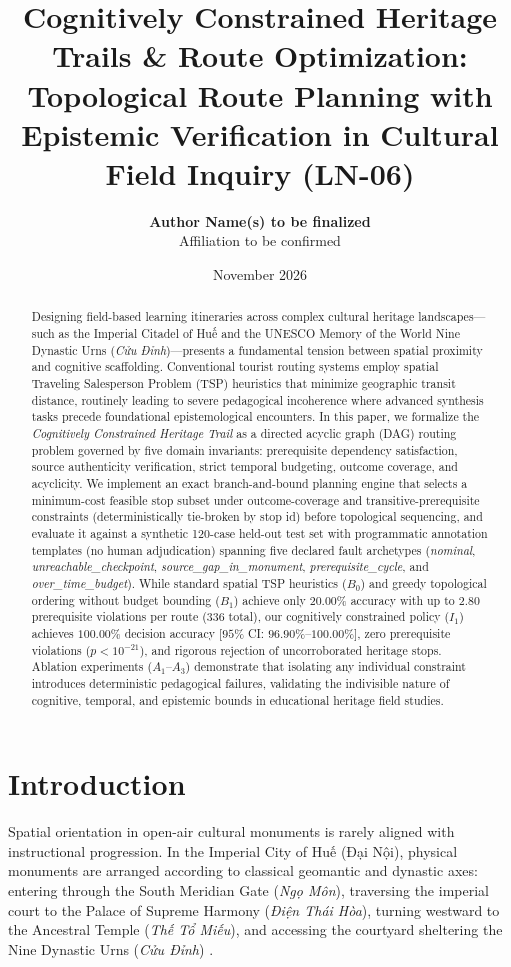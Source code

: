 \documentclass[11pt,a4paper]{article}
\title{\textbf{Cognitively Constrained Heritage Trails \& Route Optimization: \\
Topological Route Planning with Epistemic Verification in Cultural Field Inquiry (LN-06)}}
\author{\textbf{Author Name(s) to be finalized} \\
\small Affiliation to be confirmed}
\date{November 2026}
\begin{document}
\maketitle

\begin{abstract}
Designing field-based learning itineraries across complex cultural heritage landscapes---such as the Imperial Citadel of Huế and the UNESCO Memory of the World Nine Dynastic Urns (\textit{Cửu Đỉnh})---presents a fundamental tension between spatial proximity and cognitive scaffolding. Conventional tourist routing systems employ spatial Traveling Salesperson Problem (TSP) heuristics that minimize geographic transit distance, routinely leading to severe pedagogical incoherence where advanced synthesis tasks precede foundational epistemological encounters. In this paper, we formalize the \textit{Cognitively Constrained Heritage Trail} as a directed acyclic graph (DAG) routing problem governed by five domain invariants: prerequisite dependency satisfaction, source authenticity verification, strict temporal budgeting, outcome coverage, and acyclicity. We implement an exact branch-and-bound planning engine that selects a minimum-cost feasible stop subset under outcome-coverage and transitive-prerequisite constraints (deterministically tie-broken by stop id) before topological sequencing, and evaluate it against a synthetic 120-case held-out test set with programmatic annotation templates (no human adjudication) spanning five declared fault archetypes (\textit{nominal}, \textit{unreachable\_checkpoint}, \textit{source\_gap\_in\_monument}, \textit{prerequisite\_cycle}, and \textit{over\_time\_budget}). While standard spatial TSP heuristics ($B_0$) and greedy topological ordering without budget bounding ($B_1$) achieve only $20.00\%$ accuracy with up to $2.80$ prerequisite violations per route ($336$ total), our cognitively constrained policy ($I_1$) achieves $100.00\%$ decision accuracy [$95\%$ CI: $96.90\%$--$100.00\%$], zero prerequisite violations ($p < 10^{-21}$), and rigorous rejection of uncorroborated heritage stops. Ablation experiments ($A_1$--$A_3$) demonstrate that isolating any individual constraint introduces deterministic pedagogical failures, validating the indivisible nature of cognitive, temporal, and epistemic bounds in educational heritage field studies.
\end{abstract}

\section{Introduction}
Spatial orientation in open-air cultural monuments is rarely aligned with instructional progression. In the Imperial City of Huế (Đại Nội), physical monuments are arranged according to classical geomantic and dynastic axes: entering through the South Meridian Gate (\textit{Ngọ Môn}), traversing the imperial court to the Palace of Supreme Harmony (\textit{Điện Thái Hòa}), turning westward to the Ancestral Temple (\textit{Thế Tổ Miếu}), and accessing the courtyard sheltering the Nine Dynastic Urns (\textit{Cửu Đỉnh}) \cite{nguyen2026cuudinh}. 
\end{document}
